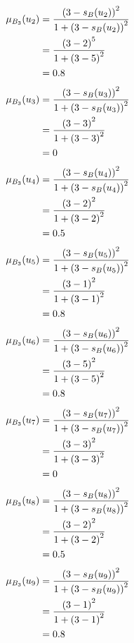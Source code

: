 \documentclass[a4paper,openany]{book}
\begin{document}
				\begin{align}
					\mu_{B_3}(u_2) &= \frac{\left(3-s_B(u_2)\right)^2}{1 + \left(3-s_B(u_2)\right)^2}\\
					&= \frac{\left(3-2\right)^5}{1 + \left(3-5\right)^2} \notag \\
					&= 0.8 \notag
				\end{align}
				\begin{align}
					\mu_{B_3}(u_3) &= \frac{\left(3-s_B(u_3)\right)^2}{1 + \left(3-s_B(u_3)\right)^2}\\
					&= \frac{\left(3-3\right)^2}{1 + \left(3-3\right)^2} \notag \\
					&= 0 \notag
				\end{align}
				\begin{align}
					\mu_{B_3}(u_4) &= \frac{\left(3-s_B(u_4)\right)^2}{1 + \left(3-s_B(u_4)\right)^2}\\
					&= \frac{\left(3-2\right)^2}{1 + \left(3-2\right)^2} \notag \\
					&= 0.5 \notag
				\end{align}
				\begin{align}
					\mu_{B_3}(u_5) &= \frac{\left(3-s_B(u_5)\right)^2}{1 + \left(3-s_B(u_5)\right)^2}\\
					&= \frac{\left(3-1\right)^2}{1 + \left(3-1\right)^2} \notag \\
					&= 0.8 \notag
				\end{align}
				\begin{align}
					\mu_{B_3}(u_6) &= \frac{\left(3-s_B(u_6)\right)^2}{1 + \left(3-s_B(u_6)\right)^2}\\
					&= \frac{\left(3-5\right)^2}{1 + \left(3-5\right)^2} \notag \\
					&= 0.8 \notag
				\end{align}
				\begin{align}
					\mu_{B_3}(u_7) &= \frac{\left(3-s_B(u_7)\right)^2}{1 + \left(3-s_B(u_7)\right)^2}\\
					&= \frac{\left(3-3\right)^2}{1 + \left(3-3\right)^2} \notag \\
					&= 0 \notag
				\end{align}
				\begin{align}
					\mu_{B_3}(u_8) &= \frac{\left(3-s_B(u_8)\right)^2}{1 + \left(3-s_B(u_8)\right)^2}\\
					&= \frac{\left(3-2\right)^2}{1 + \left(3-2\right)^2} \notag \\
					&= 0.5 \notag
				\end{align}
				\begin{align}
					\mu_{B_3}(u_9) &= \frac{\left(3-s_B(u_9)\right)^2}{1 + \left(3-s_B(u_9)\right)^2}\\
					&= \frac{\left(3-1\right)^2}{1 + \left(3-1\right)^2} \notag \\
					&= 0.8 \notag
				\end{align}
\end{document}
